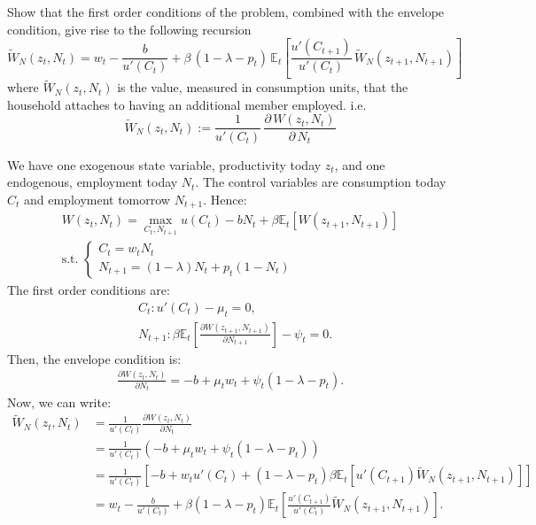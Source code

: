 \documentclass[dvipsnames,11pt]{article}
\begin{document}
\begin{enumerate}
            Show that the first order conditions of the problem, combined with the envelope condition, give rise to the following recursion
            $$ \widetilde{W}_N(z_{t},N_{t}) = w_t - \frac{b}{u'(C_t)} + \beta\,\left(1-\lambda - p_t\right)\,\mathbb{E}_t\left[\frac{u'(C_{t+1})}{u'(C_t)}\, \widetilde{W}_N(z_{t+1},N_{t+1})\right] $$
            where $\widetilde{W}_N(z_{t},N_{t})$ is the value, measured in consumption units, that the household attaches to having an additional member employed. i.e.
            $$ \widetilde{W}_N(z_{t},N_{t}) := \frac{1}{u'(C_t)}\,\frac{\partial\,W(z_{t},N_{t})}{\partial\,N_t} $$

                \begin{solution}
We have one exogenous state variable, productivity today $z_t$, and one endogenous, employment today $N_t$. The control variables are consumption today $C_t$ and employment tomorrow $N_{t+1}$. Hence:
\begin{align*}
    W(z_t,N_t)= \max_{C_t,N_{t+1}} u(C_t)-bN_t+\beta \mathbb{E}_t [W(z_{t+1}, N_{t+1})] \\
    \text{s.t. } \begin{cases}
        C_t=w_tN_t \\
        N_{t+1}=(1-\lambda)N_t+p_t(1-N_t)
    \end{cases}
\end{align*}
The first order conditions are:
\begin{align*}
    & C_t: u'(C_t)-\mu_t=0, \\
    & N_{t+1}: \beta \mathbb{E}_t \left[ \frac{\partial W (z_{t+1}, N_{t+1})}{\partial N_{t+1}} \right]-\psi_t=0.
\end{align*}
Then, the envelope condition is:
\begin{align*}
    \frac{\partial W(z_t,N_t)}{\partial N_t}=-b+\mu_tw_t+\psi_t(1-\lambda-p_t).
\end{align*}
Now, we can write:
\begin{align*}
    \widetilde{W}_N(z_t,N_t)&= \frac{1}{u'(C_t)} \frac{\partial W(z_t,N_t)}{\partial N_t} \\
    & = \frac{1}{u'(C_t)} (-b+\mu_tw_t+\psi_t(1-\lambda-p_t)) \\
    &= \frac{1}{u'(C_t)}\left[ -b+w_tu'(C_t)+(1-\lambda-p_t)\beta \mathbb{E}_t[u'(C_{t+1}) \widetilde{W}_N(z_{t+1},N_{t+1})]  \right] \\
    &= w_t-\frac{b}{u'(C_t)}+\beta (1-\lambda-p_t) \mathbb{E}_t \left[ \frac{u'(C_{t+1})}{u'(C_t)}\widetilde{W}_N(z_{t+1},N_{t+1}) \right].
\end{align*}


\end{solution}
\end{enumerate}
\end{document}
